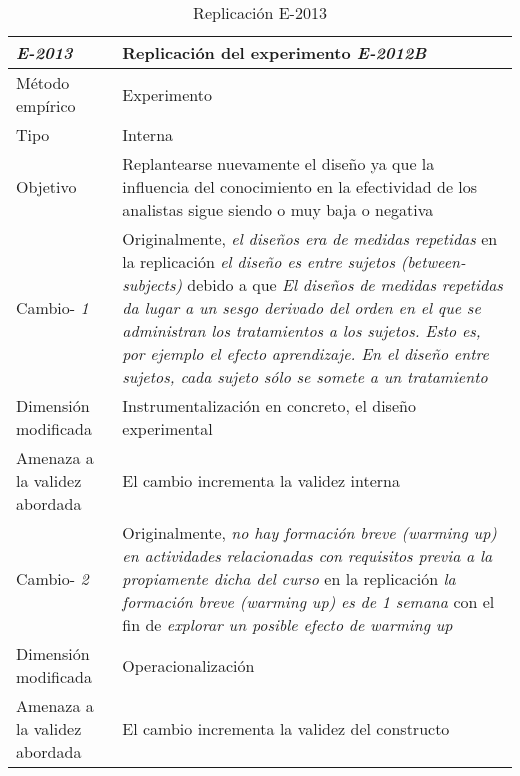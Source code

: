 
\begin{table}
\caption{Replicación E-2013}
\begin{tabular}{| p{3.3cm} | p{9cm} |}
\hline

\textbf {\textit{E-2013}} & Replicación del experimento \textit{E-2012B }    \\  \hline

Método empírico &  Experimento   \\  \hline
Tipo &  Interna   \\  \hline
Objetivo  &  Replantearse nuevamente el diseño ya que la influencia del conocimiento en la efectividad de los analistas sigue siendo o muy baja o negativa \\  \hline \hline

Cambio- \textit{1}   & \parbox[t]{9cm} {Originalmente,  \textit{ el diseños era de medidas repetidas } } \parbox[t]{9cm}{en la replicación \textit{ el diseño es entre sujetos (between-subjects) } }  debido a que \textit{El diseños de medidas repetidas da lugar a un sesgo derivado del orden en el que se administran los tratamientos a los sujetos. Esto es, por ejemplo el efecto aprendizaje. En el diseño entre sujetos, cada sujeto sólo se somete a un tratamiento } \\  \hline
Dimensión modificada & 
 Instrumentalización en concreto, el diseño experimental  \\  \hline 
Amenaza a la validez abordada  & El cambio incrementa la validez interna  \\  \hline
 \hline
 
Cambio- \textit{2}   & \parbox[t]{9cm} {Originalmente,  \textit{no hay formación breve (warming up) en actividades relacionadas con requisitos  previa a la propiamente dicha del curso} } \parbox[t]{9cm}{en la replicación \textit{ la formación breve (warming up) es de 1 semana} }  con el fin de \textit{explorar un posible efecto de warming up } \\  \hline
Dimensión modificada & 
Operacionalización \\  \hline 
Amenaza a la validez abordada  & El cambio incrementa la validez del constructo  \\  \hline
 \hline
 



\end{tabular}
\label{tab:plantilla}
\end{table}





